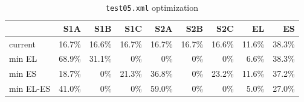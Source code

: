 \documentclass[11pt,fleqn]{book} %
\begin{document}
\begin{table}[!hb]
\begin{tabular}{l|rrrrrr|rr}
	          & S1A   & S1B   & S1C   & S2A   & S2B   & S2C   & EL    & ES \\
	\hline
	current   &16.7\% &16.6\% &16.7\% &16.7\% &16.7\% &16.6\% &11.6\% &38.3\% \\
	min EL    &68.9\% &31.1\% &   0\% &   0\% &   0\% &   0\% & 6.6\% &38.3\% \\
	min ES    &18.7\% &   0\% &21.3\% &36.8\% &   0\% &23.2\% &11.6\% &37.2\% \\
	min EL-ES &41.0\% &   0\% &   0\% &59.0\% &   0\% &   0\% & 5.0\% &27.0\% \\
\end{tabular}
	\caption{\texttt{test05.xml} optimization}
	\label{tab:optim1}
\end{table}
\end{document}
